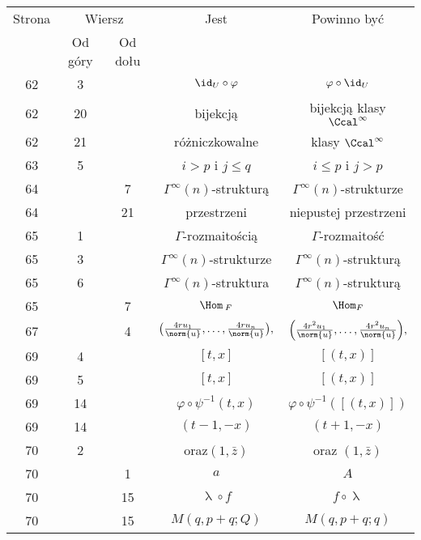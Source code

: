 \documentclass[a4paper,11pt]{article}
\numberwithin{equation}{section}
\renewcommand{\lambda}{\uplambda}
\begin{document}
\begin{center}
  \begin{tabular}{|c|c|c|c|c|}
    \hline
    Strona & \multicolumn{2}{c|}{Wiersz} & Jest
                              & Powinno być \\ \cline{2-3}
    & Od góry & Od dołu & & \\
    \hline
    62  & \hphantom{0}3 & & $\id_{ U } \circ \varphi$ & $\varphi \circ \id_{ U }$ \\
    62  & 20 & & bijekcją & bijekcją klasy $\Ccal^{ \infty }$ \\
    62  & 21 & & różniczkowalne & klasy $\Ccal^{ \infty }$ \\
    63  & \hphantom{0}5 & & $i > p$ i $j \leq q$ & $i \leq p$ i $j > p$ \\
    64  & & \hphantom{0}7 & $\Gamma^{ \infty }( n )$-strukturą
    & $\Gamma^{ \infty }( n )$-strukturze \\
    64  & & 21 & przestrzeni & niepustej przestrzeni \\
    65  & \hphantom{0}1 & & $\Gamma$-rozmaitością & $\Gamma$-rozmaitość \\
    65  & \hphantom{0}3 & & $\Gamma^{ \infty }( n )$-strukturze
           & $\Gamma^{ \infty }( n )$-strukturą \\
    65  & \hphantom{0}6 & & $\Gamma^{ \infty }( n )$-struktura
           & $\Gamma^{ \infty }( n )$-strukturą \\
    65  & & \hphantom{0}7 & $\Hom_{ \: F }$ & $\Hom_{ F }$ \\
    67  & & \hphantom{0}4 & $\big( \frac{ 4 r u_{ 1 } }{ \norm{ u } }, \ldots,
                 \frac{ 4 r u_{ n } }{ \norm{ u } } \big),$
           & $\left( \frac{ 4 r^{ 2 } u_{ 1 } }{ \norm{ u } }, \ldots,
             \frac{ 4 r^{ 2 } u_{ n } }{ \norm{ u } } \right)\! ,$ \\
    69  & \hphantom{0}4 & & $[ t, x ]$ & $[ ( t, x ) ]$ \\
    69  & \hphantom{0}5 & & $[ t, x ]$ & $[ ( t, x ) ]$ \\
    69  & 14 & & $\varphi \circ \psi^{ -1 }( t, x )$
           & $\varphi \circ \psi^{ -1 }( [ ( t, x ) ] )$ \\
    69  & 14 & & $( t - 1, -x )$ & $( t + 1, -x )$ \\
    70  & \hphantom{0}2 & & oraz$( 1, \bar{ z } )$
    & oraz $( 1, \bar{ z } )$ \\
    70  & & \hphantom{0}1 & $a$ & $A$ \\
    70  & & 15 & $\lambda \circ f$ & $f \circ \lambda$ \\
    70  & & 15 & $M( q, p + q; Q )$ & $M( q, p + q; q )$ \\

\end{tabular}
\end{center}
\end{document}

